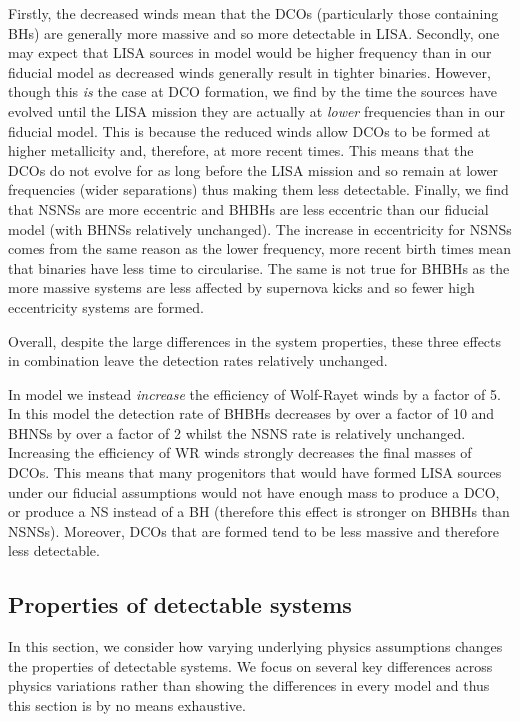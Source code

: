 Firstly, the decreased winds mean that the DCOs (particularly those containing BHs) are generally more massive and so more detectable in LISA. Secondly, one may expect that LISA sources in model \modWRLow{} would be higher frequency than in our fiducial model as decreased winds generally result in tighter binaries. However, though this \textit{is} the case at DCO formation, we find by the time the sources have evolved until the LISA mission they are actually at \textit{lower} frequencies than in our fiducial model. This is because the reduced winds allow DCOs to be formed at higher metallicity and, therefore, at more recent times. This means that the DCOs do not evolve for as long before the LISA mission and so remain at lower frequencies (wider separations) thus making them less detectable. Finally, we find that NSNSs are more eccentric and BHBHs are less eccentric than our fiducial model (with BHNSs relatively unchanged). The increase in eccentricity for NSNSs comes from the same reason as the lower frequency, more recent birth times mean that binaries have less time to circularise. The same is not true for BHBHs as the more massive systems are less affected by supernova kicks and so fewer high eccentricity systems are formed.

Overall, despite the large differences in the system properties, these three effects in combination leave the detection rates relatively unchanged.

In model \modWRHigh{} we instead \textit{increase} the efficiency of Wolf-Rayet winds by a factor of 5. In this model the detection rate of BHBHs decreases by over a factor of 10 and BHNSs by over a factor of 2 whilst the NSNS rate is relatively unchanged. Increasing the efficiency of WR winds strongly decreases the final masses of DCOs. This means that many progenitors that would have formed LISA sources under our fiducial assumptions would not have enough mass to produce a DCO, or produce a NS instead of a BH (therefore this effect is stronger on BHBHs than NSNSs). Moreover, DCOs that are formed tend to be less massive and therefore less detectable.

\subsection{Properties of detectable systems}\label{sec:property_variations}

In this section, we consider how varying underlying physics assumptions changes the properties of detectable systems. We focus on several key differences across physics variations rather than showing the differences in every model and thus this section is by no means exhaustive.


